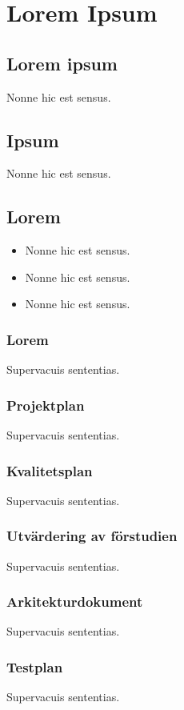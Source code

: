 \section{Lorem Ipsum}

\subsection{Lorem ipsum}
Nonne hic est sensus.

\subsection{Ipsum}
Nonne hic est sensus.

\subsection{Lorem}
\begin{itemize}
\item Nonne hic est sensus.
\item Nonne hic est sensus.
\item Nonne hic est sensus.
\end{itemize}

\subsubsection{Lorem}
Supervacuis sententias.

\subsubsection{Projektplan}
Supervacuis sententias.

\subsubsection{Kvalitetsplan}
Supervacuis sententias.

\subsubsection{Utvärdering av förstudien}
Supervacuis sententias.

\subsubsection{Arkitekturdokument}
Supervacuis sententias.

\subsubsection{Testplan}
Supervacuis sententias.

